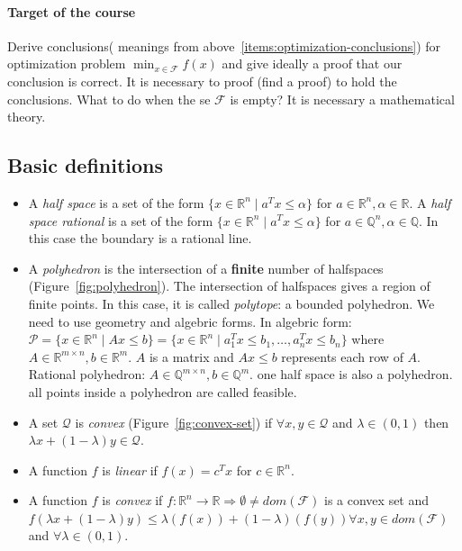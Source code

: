 \documentclass[main]{subfiles}
\begin{document}
\paragraph{Target of the course}
Derive conclusions( meanings from above~\ref{items:optimization-conclusions}) for optimization
problem $\displaystyle \min_{x \in \mathcal{F}} f(x)$ and give ideally a proof
that our conclusion is correct. It is necessary to proof (find a proof) to hold
the conclusions. What to do when the se $\mathcal{F}$ is empty? It is necessary
a mathematical theory.


\subsection{Basic definitions}
\begin{itemize}
\item A \emph{half space} is a set of the form $\{ x \in \mathbb{R}^{n} \mid
a^{T} x \leq \alpha \}$ for $a \in \mathbb{R}^{n}, \alpha \in \mathbb{R}$.
\subitem A \emph{half space rational} is a set of the form $\{ x \in
\mathbb{R}^{n} \mid a^{T} x \leq \alpha \}$ for $a \in \mathbb{Q}^{n}, \alpha
\in \mathbb{Q}$. In this case the boundary is a rational line.

\item A \emph{polyhedron} is the intersection of a \textbf{finite} number of
halfspaces (Figure~\ref{fig:polyhedron}). The intersection of halfspaces gives a
region of finite points. In this case, it is called \emph{polytope}: a bounded
polyhedron. We need to use geometry and algebric forms. In algebric form:
$\mathcal{P} = \{ x \in \mathbb{R}^{n} \mid Ax \leq b \} = \{ x \in
\mathbb{R}^{n} \mid a_{1}^{T}x \leq b_{1}, \dots, a_{n}^{T}x \leq b_{n} \}$
where $A \in \mathbb{R}^{m \times n}, b \in \mathbb{R}^{m}$. $A$ is a matrix
and $Ax \leq b$ represents each row of $A$.
\subitem Rational polyhedron: $A \in \mathbb{Q}^{ m \times n}, b \in
\mathbb{Q}^{m}$.
\subitem one half space is also a polyhedron.
\subitem all points inside a polyhedron are called feasible.
\item A set $\mathcal{Q}$ is \emph{convex} (Figure~\ref{fig:convex-set}) if
$\forall x, y \in \mathcal{Q}$ and $\lambda \in (0,1)$ then $\lambda x +
(1 - \lambda)y \in \mathcal{Q}$.

\item A function $f$ is \emph{linear} if $f(x) = c^{T}x$ for $c \in
\mathbb{R}^{n}$.

\item A function $f$ is \emph{convex} if $f: \mathbb{R}^{n} \rightarrow
\mathbb{R} \Rightarrow \emptyset \neq dom(\mathcal{F})$ is a convex set and
$f(\lambda x + (1-\lambda)y) \leq \lambda (f(x)) + (1-\lambda)(f(y)) \forall
x, y \in dom(\mathcal{F})$ and $\forall \lambda \in (0,1)$.


\end{itemize}
\end{document}

